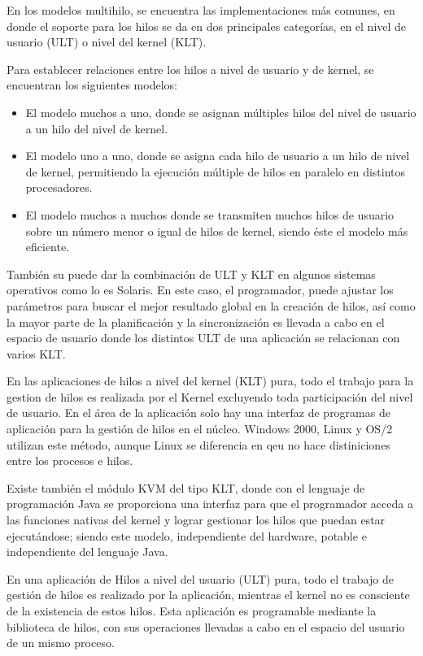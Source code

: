 \documentclass[12pt, letter]{article}
\begin{document}
%
\setlength{\parindent}{31pt}
En los modelos multihilo, se encuentra las implementaciones más comunes, en donde el soporte para los hilos se da en dos principales categorías, en el nivel de usuario (ULT) o nivel del kernel (KLT).

\setlength{\parindent}{31pt}
Para establecer relaciones entre los hilos a nivel de usuario y de kernel, se encuentran los siguientes modelos: 

\begin{itemize}
\item El modelo muchos a uno, donde se asignan múltiples hilos del nivel de usuario a un hilo del nivel de kernel.
\item El modelo uno a uno, donde se asigna cada hilo de usuario a un hilo de nivel de kernel, permitiendo la ejecución múltiple de hilos en paralelo en distintos procesadores.
\item El modelo muchos a muchos donde se transmiten muchos hilos de usuario sobre un número menor o igual de hilos de kernel, siendo éste el modelo más eficiente. 
\end{itemize}

\setlength{\parindent}{31pt}
También su puede dar la combinación de ULT y KLT en algunos sistemas operativos como lo es Solaris. En este caso, el programador, puede ajustar los parámetros para buscar el mejor resultado global en la creación de hilos, así como la mayor parte de la planificación y la sincronización es llevada a cabo en el espacio de usuario donde los distintos ULT de una aplicación se relacionan con varios KLT.

%
\setlength{\parindent}{31pt}
En las aplicaciones de hilos a nivel del kernel (KLT) pura, todo el trabajo para la gestion de hilos es realizada por el Kernel excluyendo toda participación del nivel de usuario. En el área de la aplicación solo hay una interfaz de programas de aplicación para la gestión de hilos en el núcleo. Windows 2000, Linux y OS/2 utilizan este método, aunque Linux se diferencia en qeu no hace distiniciones entre los procesos e hilos.

\setlength{\parindent}{31pt}
Existe también el módulo KVM del tipo KLT, donde con el lenguaje de programación Java se proporciona una interfaz para que el programador acceda a las funciones nativas del kernel y lograr gestionar los hilos que puedan estar ejecutándose; siendo este modelo, independiente del hardware, potable e independiente del lenguaje Java.

\setlength{\parindent}{31pt}
En una aplicación de Hilos a nivel del usuario (ULT) pura, todo el trabajo de gestión de hilos es realizado por la aplicación, mientras el kernel no es consciente de la existencia de estos hilos. Esta aplicación es programable mediante la biblioteca de hilos, con sus operaciones llevadas a cabo en el espacio del usuario de un mismo proceso. 
\end{document}

